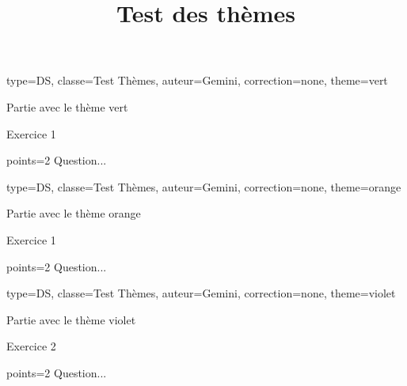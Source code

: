 \documentclass{nfdevoirs}
\title{Test des thèmes}
\begin{document}
\begin{devoir}{
        type=DS,
        classe={Test Thèmes},
        auteur={Gemini},
        correction=none,
        theme=vert
    }
    \begin{partie}{Partie avec le thème vert}
        \begin{exercice}{Exercice 1}
            \begin{question}{points=2}
                Question...
            \end{question}
        \end{exercice}
    \end{partie}
\end{devoir}

\newpage

\begin{devoir}{
        type=DS,
        classe={Test Thèmes},
        auteur={Gemini},
        correction=none,
        theme=orange
    }
    \begin{partie}{Partie avec le thème orange}
        \begin{exercice}{Exercice 1}
            \begin{question}{points=2}
                Question...
            \end{question}
        \end{exercice}
    \end{partie}
\end{devoir}

\newpage

\begin{devoir}{
        type=DS,
        classe={Test Thèmes},
        auteur={Gemini},
        correction=none,
        theme=violet
    }
    \begin{partie}{Partie avec le thème violet}
        \begin{exercice}{Exercice 2}
            \begin{question}{points=2}
                Question...
            \end{question}
        \end{exercice}
    \end{partie}
\end{devoir}
\end{document}
